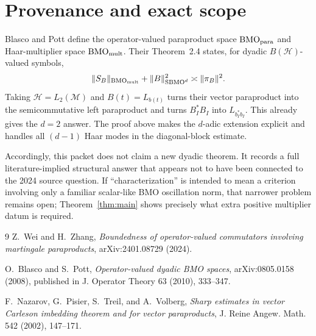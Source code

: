 \documentclass[11pt]{article}
\newcommand{\M}{\mathcal M}
\newcommand{\BMO}{\mathrm{BMO}}
\begin{document}
\section{Provenance and exact scope}

Blasco and Pott define the operator-valued paraproduct space
$\BMO_{\rm para}$ and Haar-multiplier space $\BMO_{\rm mult}$.  Their
Theorem~2.4 states, for dyadic $B(\mathcal H)$-valued symbols,
\[
 \|S_B\|_{\BMO_{\rm mult}}+\|B\|_{\mathrm{SBMO}^d}^2
 \asymp\|\pi_B\|^2.
\]
Taking $\mathcal H=L_2(\M)$ and $B(t)=L_{b(t)}$ turns their vector
paraproduct into the semicommutative left paraproduct and turns
$B_I^*B_I$ into $L_{b_I^*b_I}$.  This already gives the $d=2$ answer.  The
proof above makes the $d$-adic extension explicit and handles all
$(d-1)$ Haar modes in the diagonal-block estimate.

Accordingly, this packet does not claim a new dyadic theorem.  It records a
full literature-implied structural answer that appears not to have been
connected to the 2024 source question.  If ``characterization'' is intended
to mean a criterion involving only a familiar scalar-like BMO oscillation
norm, that narrower problem remains open; Theorem~\ref{thm:main} shows
precisely what extra positive multiplier datum is required.

\begin{thebibliography}{9}
Z.~Wei and H.~Zhang,
\emph{Boundedness of operator-valued commutators involving martingale
paraproducts}, arXiv:2401.08729 (2024).

O.~Blasco and S.~Pott,
\emph{Operator-valued dyadic BMO spaces}, arXiv:0805.0158 (2008),
published in J. Operator Theory 63 (2010), 333--347.

F.~Nazarov, G.~Pisier, S.~Treil, and A.~Volberg,
\emph{Sharp estimates in vector Carleson imbedding theorem and for vector
paraproducts}, J. Reine Angew. Math. 542 (2002), 147--171.
\end{thebibliography}
\end{document}
